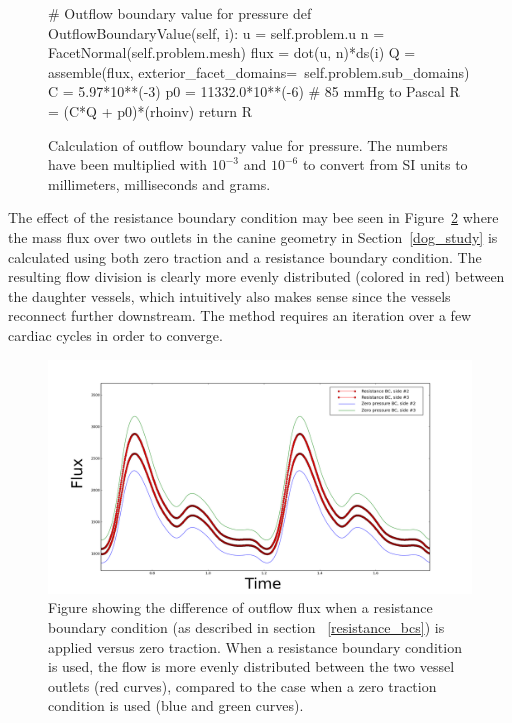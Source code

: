 \begin{figure}
\begin{python}
# Outflow boundary value for pressure
def OutflowBoundaryValue(self, i):
    u = self.problem.u
    n = FacetNormal(self.problem.mesh)
    flux = dot(u, n)*ds(i)
    Q = assemble(flux,
                 exterior_facet_domains=\
                 self.problem.sub_domains)
    C = 5.97*10**(-3)
    p0 = 11332.0*10**(-6) # 85 mmHg to Pascal
    R = (C*Q + p0)*(rhoinv)
    return R
\end{python}
\caption{Calculation of outflow boundary value for pressure. The
numbers have been multiplied with $10^{-3}$
and $10^{-6}$ to convert from SI units to millimeters, milliseconds
and grams.}
\label{fig:kvs-2:resistance_code}
\end{figure}

The effect of the resistance boundary condition may bee seen in
Figure~\ref{fig:kvs-2:resistance_bcs_fig} where the mass flux over two
outlets in the canine geometry in Section~\ref{dog_study} is
calculated using both zero traction and a resistance boundary
condition. The resulting flow division is clearly more evenly
distributed (colored in red) between the daughter vessels, which
intuitively also makes sense since the vessels reconnect further
downstream. The method requires an iteration over a few cardiac cycles
in order to converge.

\begin{figure}
  \centering
  \includegraphics[width=\largefig]{chapters/kvs-2/png/zero_dp_vs_res.png}
  \caption{Figure showing the difference of outflow
    flux when a resistance boundary condition (as described in section
    ~\ref{resistance_bcs}) is applied versus zero traction. When a
    resistance boundary condition is used, the flow is more evenly
    distributed between the two vessel outlets (red curves), compared
    to the case when a zero traction condition is used (blue and green
    curves).}
  \label{fig:kvs-2:resistance_bcs_fig}
\end{figure}

